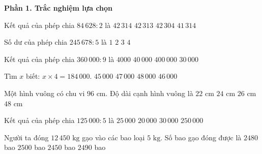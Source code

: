 \textbf{Phần 1. Trắc nghiệm lựa chọn}

\begin{ex} %
Kết quả của phép chia $84\,628 : 2$ là
\choice
{\True $42\,314$}
{$42\,313$}
{$42\,304$}
{$41\,314$}
\end{ex}

\begin{ex} %
Số dư của phép chia $245\,678 : 5$ là
\choice
{$1$}
{$2$}
{\True $3$}
{$4$}
\end{ex}

\begin{ex} %
Kết quả của phép chia $360\,000 : 9$ là
\choice
{$4000$}
{\True $40\,000$}
{$400\,000$}
{$30\,000$}
\end{ex}

\begin{ex} %
Tìm $x$ biết: $x \times 4 = 184\,000$.
\choice
{$45\,000$}
{$47\,000$}
{$48\,000$}
{\True $46\,000$}
\end{ex}

\begin{ex} %
Một hình vuông có chu vi $96\text{ cm}$. Độ dài cạnh hình vuông là
\choice
{$22\text{ cm}$}
{\True $24\text{ cm}$}
{$26\text{ cm}$}
{$48\text{ cm}$}
\end{ex}

\begin{ex} %
Kết quả của phép chia $125\,000 : 5$ là
\choice
{\True $25\,000$}
{$20\,000$}
{$30\,000$}
{$250\,000$}
\end{ex}

\begin{ex} %
Người ta đóng $12\,450\text{ kg}$ gạo vào các bao loại $5\text{ kg}$. Số bao gạo đóng được là
\choice
{$2480$ bao}
{$2500$ bao}
{$2450$ bao}
{\True $2490$ bao}
\end{ex}

